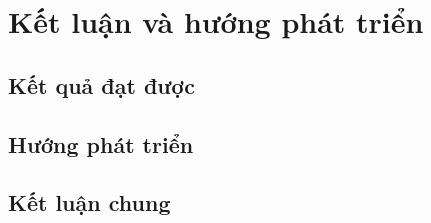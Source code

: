 \section{Kết luận và hướng phát triển}

\subsection{Kết quả đạt được}

\subsection{Hướng phát triển}

\subsection{Kết luận chung}
